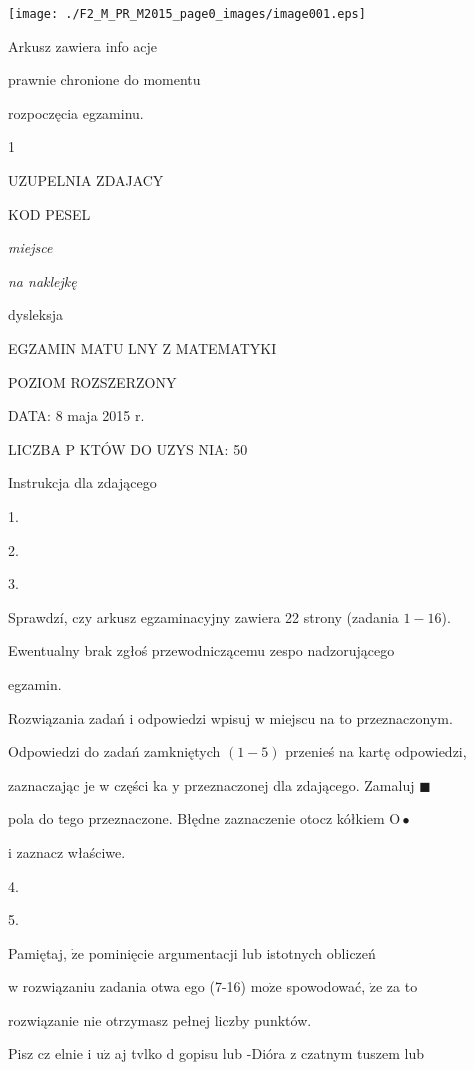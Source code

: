 \documentclass[a4paper,12pt]{article}
\begin{document}
\begin{center}
\texttt{[image: ./F2\_M\_PR\_M2015\_page0\_images/image001.eps]}
\end{center}
Arkusz zawiera info acje

prawnie chronione do momentu

rozpoczęcia egzaminu.

1

UZUPELNIA ZDAJACY

KOD  PESEL

{\it miejsce}

{\it na naklejkę}

dysleksja

EGZAMIN MATU  LNY Z MATEMATYKI

POZIOM ROZSZERZONY

DATA: 8 maja 2015 r.

LICZBA P  KTÓW DO UZYS NIA: 50

Instrukcja dla zdającego

1.

2.

3.

Sprawdzí, czy arkusz egzaminacyjny zawiera 22 strony (zadania $1-16$).

Ewentualny brak zgłoś przewodniczącemu zespo nadzorującego

egzamin.

Rozwiązania zadań i odpowiedzi wpisuj w miejscu na to przeznaczonym.

Odpowiedzi do zadań zamkniętych $(1-5)$ przenieś na kartę odpowiedzi,

zaznaczając je w części ka $\mathrm{y}$ przeznaczonej dla zdającego. Zamaluj $\blacksquare$

pola do tego przeznaczone. Błędne zaznaczenie otocz kółkiem $\mathrm{O}\bullet$

i zaznacz właściwe.

4.

5.

Pamiętaj, $\dot{\mathrm{z}}\mathrm{e}$ pominięcie argumentacji lub istotnych obliczeń

w rozwiązaniu zadania otwa ego (7-16) $\mathrm{m}\mathrm{o}\dot{\mathrm{z}}\mathrm{e}$ spowodować, $\dot{\mathrm{z}}\mathrm{e}$ za to

rozwiązanie nie otrzymasz pełnej liczby punktów.

Pisz cz elnie i $\mathrm{u}\dot{\mathrm{z}}$ aj tvlko $\mathrm{d}$ gopisu lub -Dióra z czatnym tuszem lub
\end{document}
